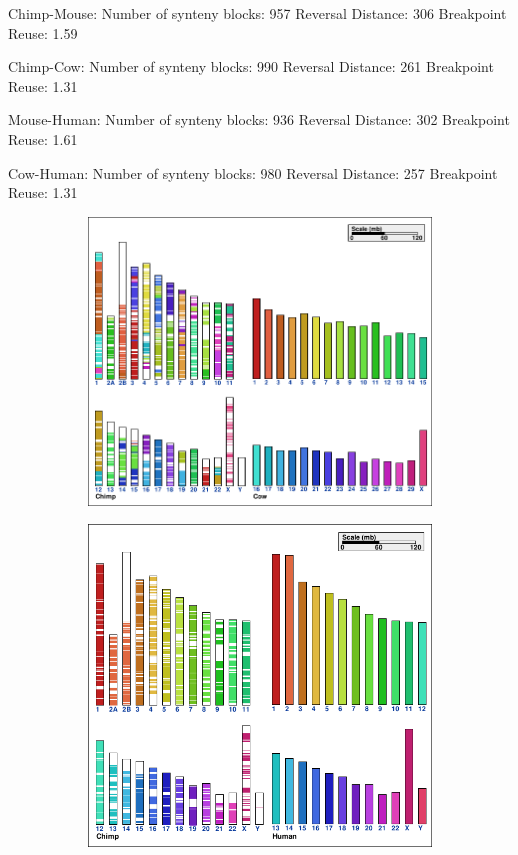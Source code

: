 Chimp-Mouse:
Number of synteny blocks: 957
Reversal Distance: 306
Breakpoint Reuse: 1.59

Chimp-Cow:
Number of synteny blocks: 990
Reversal Distance: 261
Breakpoint Reuse: 1.31

Mouse-Human:
Number of synteny blocks: 936
Reversal Distance: 302
Breakpoint Reuse: 1.61

Cow-Human:
Number of synteny blocks: 980
Reversal Distance: 257
Breakpoint Reuse: 1.31
\pgfplotsset{compat=newest}            %
 
\begin{figure}[!h]
\centering
\begin{subfigure}[b]{0.15\textwidth}
\includegraphics[width=\textwidth]{imag/graph3_chim_cow1}
\end{subfigure}
\begin{subfigure}[b]{0.14\textwidth}
\includegraphics[width=\textwidth]{imag/graph3_chim_Himan1}

\end{subfigure}
\end{figure}
